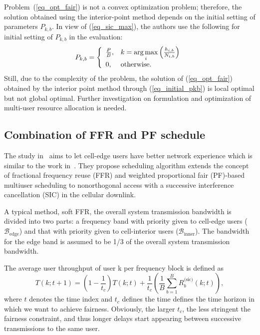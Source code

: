 Problem~(\ref{eq_opt_fair}) is not a convex optimization problem; therefore, the solution obtained using the interior-point method depends on the initial setting of parameters $P_{k,b}$. In view of (\ref{eq_sic_max}), the authors use the following for initial setting of $P_{k,b}$ in the evaluation:
\begin{equation}
\label{eq_initial_pkb}
 P_{k,b} = \left\{
  \begin{array}{l l}
    \frac{P}{B}, & k=\underset{i}{\arg\max} \left(\frac{h_{i,b}}{N_{i,b}}\right)\\
    0,     & \text{otherwise.}
  \end{array} \right.
\end{equation}
Still, due to the complexity of the problem, the solution of (\ref{eq_opt_fair}) obtained by the interior point method through (\ref{eq_initial_pkb}) is local optimal but not global optimal. Further investigation on formulation and optimization of multi-user resource allocation is needed.




\subsection{Combination of FFR and PF schedule}
\label{sec_ffr_pf}
The study in~\cite{cite_docomo3} aims to let cell-edge users have better network experience 
which is similar to the work in~\cite{cite_docomo2}. 
They propose scheduling algorithm extends the concept of fractional frequency reuse (FFR) and 
weighted proportional fair (PF)-based multiuser scheduling to nonorthogonal access with a 
successive interference cancellation (SIC) in the cellular downlink. 

A typical method, soft FFR, the overall system transmission bandwidth is divided into two parts: 
a frequency band with priority given to cell-edge users ($\mathcal{B}_{\text{edge}}$) and that 
with priority given to cell-interior users ($\mathcal{B}_{\text{inner}}$). The bandwidth for the
edge band is assumed to be 1/3 of the overall system transmission bandwidth.

The average user throughput of user k per frequency block is defined as
\begin{equation}
\label{eq_avg_throughput}
T(k;t+1)=\left(1-\frac{1}{t_c}\right)T(k;t)+\frac{1}{t_c}\left(\frac{1}{B}\sum_{b=1}^{B} R^{\text{(sic)}}_b(k;t)\right),
\end{equation}
where $t$ denotes the time index and $t_c$ defines the time defines the time horizon in which we want
to achieve fairness. Obviously, the larger $t_c$, the less stringent
the fairness constraint, and thus longer delays start appearing
between successive transmissions to the same user.

